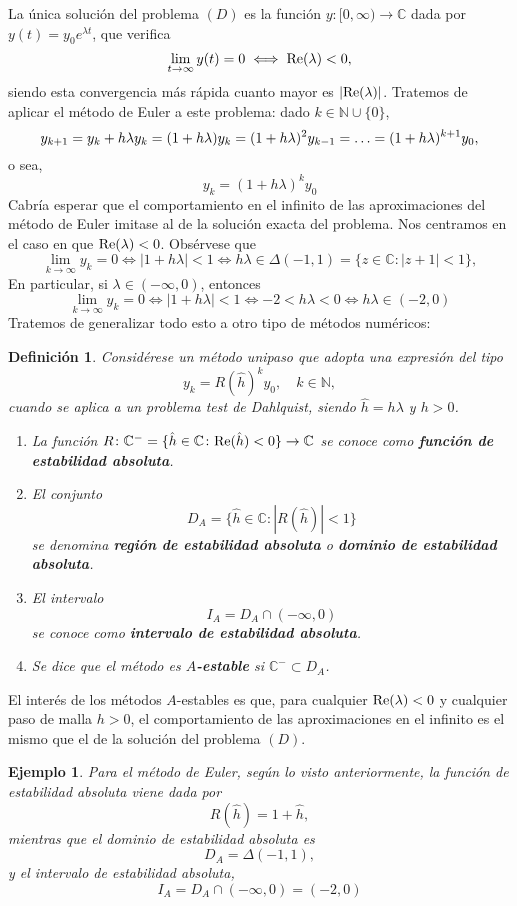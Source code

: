 \documentclass[11pt]{report}
\theoremstyle{mytheorem}
\theoremstyle{mydefinition}
\newtheorem{definition}{Definición}
\theoremstyle{myexample}
\newtheorem*{example}{Ejemplo}
\newenvironment{cdefinition} %
  {\begin{mdframed}[
        linewidth=3pt,
        linecolor=c1,
        bottomline=false,
        topline=false,
        rightline=false,
        innerrightmargin=0pt,
        innertopmargin=0pt,
        innerbottommargin=0pt,
        innerleftmargin=1em, %
        skipabove=\baselineskip]
    \begin{definition}}
  {\end{definition}\end{mdframed}}
\newcommand{\N}{\mathbb N}
\newcommand{\C}{\mathbb C}
\newcommand{\mybf}[1]{\boldmath\textbf{\color{c1}#1}\unboldmath}
\begin{document}
La única solución del problema $(D)$ es la función $y \colon [0,\infty) \to \C$ dada por $y(t) = y_0e^{\lambda t}$, que verifica
\[\lim_{t \to \infty} y(t)=0 \iff \textup{Re}(\lambda) < 0,\]
siendo esta convergencia más rápida cuanto mayor es $|\textup{Re}(\lambda)|$. Tratemos de aplicar el método de Euler a este problema: dado $k \in \N \cup \{0\}$,
\[y_{k+1}=y_k+h\lambda y_k=(1+h\lambda)y_k = (1+h\lambda)^2y_{k-1}=\mathellipsis = (1+h\lambda)^{k+1}y_0,\]
o sea,
\[y_k = (1+h\lambda)^k y_0\]
Cabría esperar que el comportamiento en el infinito de las aproximaciones del método de Euler imitase al de la solución exacta del problema. Nos centramos en el caso en que $\textup{Re}(\lambda) <0$. Obsérvese que
\[\lim_{k \to \infty} y_k = 0 \iff |1+h\lambda| < 1 \iff h\lambda \in \Delta(-1,1) = \{z \in \C \colon |z+1|<1\},\]
En particular, si $\lambda \in (-\infty,0)$, entonces
\[\lim_{k \to \infty} y_k = 0 \iff |1+h\lambda| < 1 \iff -2 < h\lambda < 0 \iff h\lambda \in (-2,0)\]
Tratemos de generalizar todo esto a otro tipo de métodos numéricos:
\begin{cdefinition}
Considérese un método unipaso que adopta una expresión del tipo
\[y_k = R(\hat{h})^k y_0, \quad k \in \N,\]
cuando se aplica a un problema test de Dahlquist, siendo $\hat{h} = h\lambda$ y $h >0$.
\begin{enumerate}
    \item La función $R \colon \C^-= \{\hat{h} \in \C \colon \textup{Re}(\hat{h}) <0\} \to \C$ se conoce como \mybf{función de estabilidad absoluta}.
    \item El conjunto
    \[D_A = \{\hat{h} \in \C \colon |R(\hat{h})| <1\}\]
    se denomina \mybf{región de estabilidad absoluta} o \mybf{dominio de estabilidad absoluta}.
    \item El intervalo
    \[I_A = D_A \cap (-\infty,0)\]
    se conoce como \mybf{intervalo de estabilidad absoluta}.
    \item Se dice que el método es \mybf{$A$-estable} si $\C^- \subset D_A$. 
\end{enumerate}
\end{cdefinition}

\vspace{\parskip}

El interés de los métodos $A$-estables es que, para cualquier $\textup{Re}(\lambda)<0$ y cualquier paso de malla $h>0$, el comportamiento de las aproximaciones en el infinito es el mismo que el de la solución del problema $(D)$.

\begin{example}
Para el método de Euler, según lo visto anteriormente, la función de estabilidad absoluta viene dada por
\[R(\hat{h}) = 1+\hat{h},\]
mientras que el dominio de estabilidad absoluta es
\[D_A = \Delta(-1,1),\]
y el intervalo de estabilidad absoluta,
\[I_A = D_A \cap (-\infty,0)= (-2,0)\]
\end{example}
\end{document}
